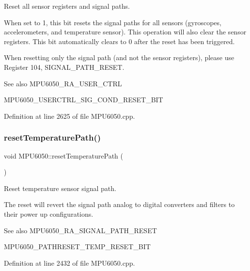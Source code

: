 Reset all sensor registers and signal paths. 

When set to 1, this bit resets the signal paths for all sensors (gyroscopes, accelerometers, and temperature sensor). This operation will also clear the sensor registers. This bit automatically clears to 0 after the reset has been triggered.

When resetting only the signal path (and not the sensor registers), please use Register 104, S\+I\+G\+N\+A\+L\+\_\+\+P\+A\+T\+H\+\_\+\+R\+E\+S\+ET.

\begin{DoxySeeAlso}{See also}
M\+P\+U6050\+\_\+\+R\+A\+\_\+\+U\+S\+E\+R\+\_\+\+C\+T\+RL 

M\+P\+U6050\+\_\+\+U\+S\+E\+R\+C\+T\+R\+L\+\_\+\+S\+I\+G\+\_\+\+C\+O\+N\+D\+\_\+\+R\+E\+S\+E\+T\+\_\+\+B\+IT 
\end{DoxySeeAlso}


Definition at line 2625 of file M\+P\+U6050.\+cpp.

\mbox{\label{classMPU6050_a559c2d091d36a4e0489bc639916ddbb6}} 
\subsubsection{\texorpdfstring{resetTemperaturePath()}{resetTemperaturePath()}}
{\footnotesize\ttfamily void M\+P\+U6050\+::reset\+Temperature\+Path (\begin{DoxyParamCaption}{ }\end{DoxyParamCaption})}



Reset temperature sensor signal path. 

The reset will revert the signal path analog to digital converters and filters to their power up configurations. \begin{DoxySeeAlso}{See also}
M\+P\+U6050\+\_\+\+R\+A\+\_\+\+S\+I\+G\+N\+A\+L\+\_\+\+P\+A\+T\+H\+\_\+\+R\+E\+S\+ET 

M\+P\+U6050\+\_\+\+P\+A\+T\+H\+R\+E\+S\+E\+T\+\_\+\+T\+E\+M\+P\+\_\+\+R\+E\+S\+E\+T\+\_\+\+B\+IT 
\end{DoxySeeAlso}


Definition at line 2432 of file M\+P\+U6050.\+cpp.

\mbox{\label{classMPU6050_a2bbde7653d2d2d37e16e515599f3b08b}} 
